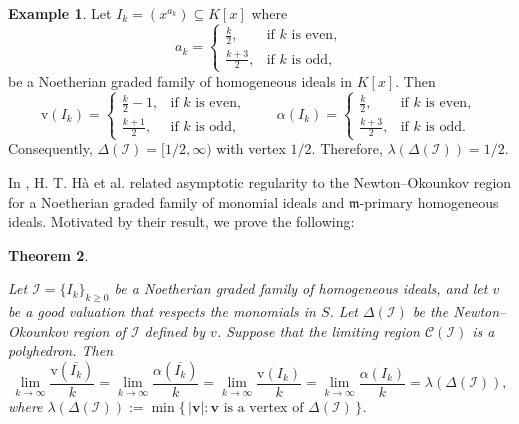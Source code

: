 \documentclass[11pt,reqno,a4paper]{amsart}
\newtheorem{theorem}{Theorem}[section]
\theoremstyle{definition}
\newtheorem{example}[theorem]{Example}
\begin{document}
\begin{example}
    
     Let \(I_k = (x^{a_k}) \subseteq K[x]\) where 
    \[
    a_k = \begin{cases} 
    \frac{k}{2}, & \text{if } k \text{ is even}, \\
    \frac{k+3}{2}, & \text{if } k \text{ is odd},
    \end{cases}
    \]
    be a Noetherian graded family of homogeneous ideals in \(K[x]\). Then
    \[
    \mathrm{v}(I_k) = \begin{cases} 
    \frac{k}{2} - 1, & \text{if } k \text{ is even}, \\
    \frac{k+1}{2}, & \text{if } k \text{ is odd},
    \end{cases}
    \qquad
    \alpha(I_k) = \begin{cases} 
    \frac{k}{2}, & \text{if } k \text{ is even}, \\
    \frac{k+3}{2}, & \text{if } k \text{ is odd}.
    \end{cases}
    \]
    Consequently, \(\Delta(\mathcal{I}) = [1/2, \infty)\) with vertex \(1/2\).  
    Therefore, \(\lambda(\Delta(\mathcal{I})) = 1/2\).
\end{example}







In \cite{HaNguyenNguyen25}, H. T. Hà et al. related asymptotic regularity to the Newton–Okounkov region for a Noetherian graded family of monomial ideals and \(\mathfrak{m}\)-primary homogeneous ideals. Motivated by their result, we prove the following:




\begin{theorem}\label{NORforvaluations}
    


Let $\mathcal{I} = \{I_k\}_{k \ge 0}$ be a Noetherian graded family of homogeneous ideals, 
and let $v$ be a good valuation that respects the monomials in $S$. 
Let $\Delta(\mathcal{I})$ be the Newton--Okounkov region of 
$\mathcal{I}$ defined by $v$. Suppose that the limiting region $\mathcal{C}(\mathcal{I})$ is a polyhedron. Then
\[
\lim_{k \to \infty} \frac{\mathrm{v}(\overline{I_k})}{k} 
= \lim_{k \to \infty} \frac{\alpha(\overline{I_k})}{k}
= \lim_{k \to \infty} \frac{\mathrm{v}(I_k)}{k}
= \lim_{k \to \infty} \frac{\alpha(I_k)}{k}
= \lambda(\Delta(\mathcal{I})),
\]
where $\lambda(\Delta(\mathcal{I})) := \min\{\,|\mathbf{v}| : \mathbf{v} \text{ is a vertex of } \Delta(\mathcal{I})\,\}$.


\end{theorem}
\end{document}
